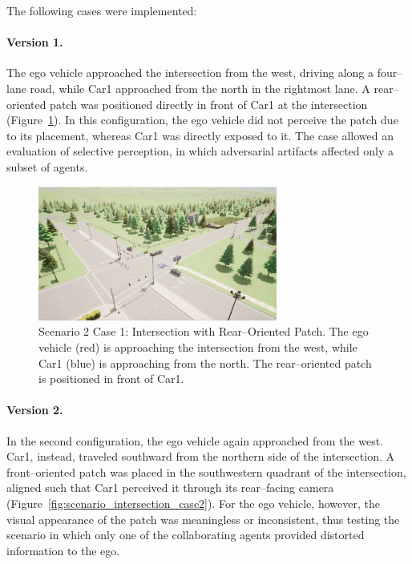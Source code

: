 The following cases were implemented:

\paragraph{Version 1.}  
The ego vehicle approached the intersection from the west, driving along a four–lane road, while Car1 approached from the north in the rightmost lane.  
A rear–oriented patch was positioned directly in front of Car1 at the intersection (Figure~\ref{fig:scenario_intersection_case1}). In this configuration, the ego vehicle did not perceive the patch due to its placement, whereas Car1 was directly exposed to it. The case allowed an evaluation of selective perception, in which adversarial artifacts affected only a subset of agents.

\begin{figure}[H]
    \centering
    \includegraphics[width=0.7\textwidth]{figures/experiments/scenario2_v1.png}
    \caption{Scenario 2 Case 1: Intersection with Rear–Oriented Patch. The ego vehicle (red) is approaching the intersection from the west, while Car1 (blue) is approaching from the north. The rear–oriented patch is positioned in front of Car1.}
    \label{fig:scenario_intersection_case1}
\end{figure}

\paragraph{Version 2.}  
In the second configuration, the ego vehicle again approached from the west. Car1, instead, traveled southward from the northern side of the intersection. A front–oriented patch was placed in the southwestern quadrant of the intersection, aligned such that Car1 perceived it through its rear–facing camera (Figure~\ref{fig:scenario_intersection_case2}).  
For the ego vehicle, however, the visual appearance of the patch was meaningless or inconsistent, thus testing the scenario in which only one of the collaborating agents provided distorted information to the ego.


